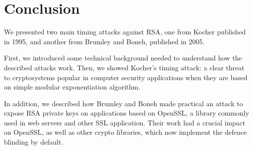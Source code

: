\section{Conclusion}

We presented two main timing attacks against RSA, one from Kocher published in 1995, and another from Brumley and Boneh, published in 2005.

First, we introduced some technical background needed to understand how the described attacks work.
Then, we showed Kocher's timing attack: a clear threat to cryptosystems popular in computer security applications when they are based on simple modular exponentiation algorithm.

In addition, we described how Brumley and Boneh made practical an attack to expose RSA private keys on applications based on OpenSSL, a library commonly used in web servers and other SSL application. Their work had a crucial impact on OpenSSL, as well as other crypto libraries, which now implement the defence blinding by default.


